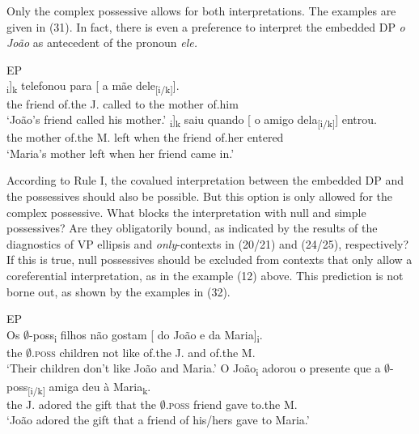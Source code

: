 \documentclass[output=paper]{langsci/langscibook}
\begin{document}
Only the complex possessive allows for both interpretations. The examples are given in (31). In fact, there is even a preference to interpret the embedded DP \textit{o João} as antecedent of the pronoun \textit{ele.}

\ea%
         EP\label{ex:wein:31}\\
    \ea  
    \gll \relax [ O amigo d[o João]\textsubscript{i}]\textsubscript{k} telefonou para [ a mãe dele\textsubscript{[i/k]}].\\
         {} the friend of.the J. called to {} the mother of.him\\
    \glt ‘João’s friend called his mother.’
    \ex  
    \gll \relax [ A mãe d[a Maria]\textsubscript{i}]\textsubscript{k} saiu quando [ o amigo dela\textsubscript{[i/k]}] entrou.\\
         {} the mother of.the M. left when {} the friend of.her entered\\
    \glt ‘Maria’s mother left when her friend came in.’
    \z
\z

According to Rule I, the covalued interpretation between the embedded DP and the possessives should also be possible. But this option is only allowed for the complex possessive. What blocks the  interpretation with null and simple possessives? Are they obligatorily bound, as indicated by the results of the diagnostics of VP ellipsis and \textit{only}{}-contexts in (20/21) and (24/25), respectively? If this is true, null possessives should be excluded from contexts that only allow a coreferential interpretation, as in the  example (12) above. This prediction is not borne out, as shown by the examples in (32).

\ea%
         EP\label{ex:wein:32}\\
    \ea  
    \gll Os $\emptyset$-poss\textsubscript{i} filhos não gostam [ do João e da Maria]\textsubscript{i}.\\
         the $\emptyset$\textsc{.poss} children not like {} of.the J. and of.the M.\\
    \glt ‘Their children don’t like João and Maria.’
    \ex 
    \gll O João\textsubscript{i} adorou o presente que a $\emptyset$-poss\textsubscript{[i/k]} amiga deu à Maria\textsubscript{k}.\\
         the J. adored the gift that the $\emptyset$\textsc{.poss} friend gave to.the M.\\
    \glt ‘João adored the gift that a friend of his\slash hers gave to Maria.’
    \z
\z    
\end{document}
